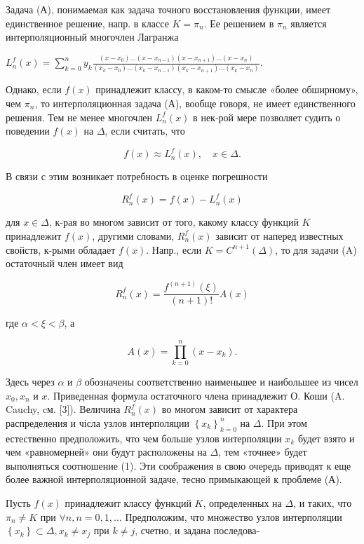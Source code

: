 \documentclass[10pt]{article}
\begin{document}
Задача (А), понимаемая как задача точного восстановления функции, имеет единственное решение, напр. в классе $K=\pi_{n}$. Ее решением в $\pi_{n}$ является интерполяционный многочлен Лагранжа



$L_{n}^{f}(x)=\sum_{k=0}^{n} y_{k} \frac{\left(x-x_{0}\right) \ldots\left(x-x_{n-1}\right)\left(x-x_{n+1}\right) \ldots\left(x-x_{n}\right)}{\left(x_{k}-x_{0}\right) \ldots\left(x_{k}-x_{n-1}\right)\left(x_{k}-x_{n+1}\right) \ldots\left(x_{k}-x_{n}\right)}$.



Однако, если $f(x)$ принадлежит классу, в каком-то смысле «более обширному», чем $\pi_{n}$, то интерполяционная задача (А), вообще говоря, не имеет единственного решения. Тем не менее многочлен $L_{n}^{f}(x)$ в нек-рой мере позволяет судить о поведении $f(x)$ на $\Delta$, если считать, что



\[

f(x) \approx L_{n}^{f}(x), \quad x \in \Delta .

\]



В связи с этим возникает потребность в оценке погрешности



\[

R_{n}^{f}(x)=f(x)-L_{n}^{f}(x)

\]



для $x \in \Delta$, к-рая во многом зависит от того, какому классу функций $K$ принадлежит $f(x)$, другими словами, $R_{n}^{f}(x)$ зависит от наперед известных свойств, к-рыми обладает $f(x)$. Напр., если $K=C^{n+1}(\Delta)$, то для задачи (A) остаточный член имеет вид



\[

R_{n}^{f}(x)=\frac{f^{(n+1)}(\xi)}{(n+1) !} A(x)

\]



где $\alpha<\xi<\beta$, а



\[

A(x)=\prod_{k=0}^{n}\left(x-x_{k}\right) .

\]



Здесь через $\alpha$ и $\beta$ обозначены соответственно наименьшее и наибольшее из чисел $x_{0}, x_{n}$ и $x$. Приведенная формула остаточного члена принадлежит О. Коши (A. Cauchy, cм. [3]). Величина $R_{n}^{f}(x)$ во многом зависит от характера распределения и чісла узлов интерполяции $\left\{x_{k}\right\}_{k=0}^{n}$ на $\Delta$. При этом естественно предположить, что чем больше узлов интерполяции $x_{k}$ будет взято и чем «равномерней» они будут расположены на $\Delta$, тем «точнее» будет выполняться соотношение (1). Эти соображения в свою очередь приводят к еще более важной интерполяционной задаче, тесно примыкающей к проблеме (А).



Пусть $f(x)$ принадлежит классу функций $K$, определенных на $\Delta$, и таких, что $\pi_{n} \neq K$ при $\forall n, n=0,1, \ldots$ Предположим, что множество узлов интерполяции $\left\{x_{k}\right\} \subset \Delta, x_{k} \neq x_{j}$ при $k \neq j$, счетно, и задана последова-
\end{document}
